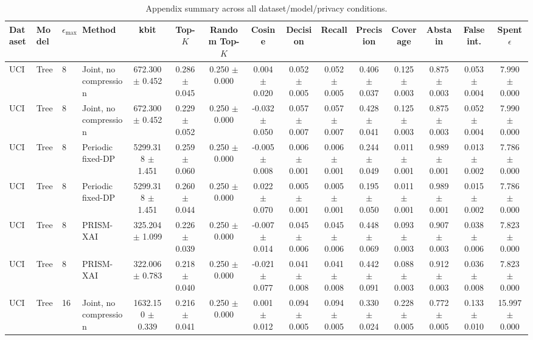 \begin{table}[t]
\caption{Appendix summary across all dataset/model/privacy conditions.}
\label{tab:appendix-conditions}
\centering
\scriptsize
\setlength{\tabcolsep}{2.5pt}
\begin{tabular}{llllccccccccccc}
\toprule
Dataset & Model & $\epsilon_{\max}$ & Method & kbit & Top-$K$ & Random Top-$K$ & Cosine & Decision & Recall & Precision & Coverage & Abstain & False int. & Spent $\epsilon$ \\
\midrule
UCI & Tree & 8 & Joint, no compression & 672.300 $\pm$ 0.452 & 0.286 $\pm$ 0.045 & 0.250 $\pm$ 0.000 & 0.004 $\pm$ 0.020 & 0.052 $\pm$ 0.005 & 0.052 $\pm$ 0.005 & 0.406 $\pm$ 0.037 & 0.125 $\pm$ 0.003 & 0.875 $\pm$ 0.003 & 0.053 $\pm$ 0.004 & 7.990 $\pm$ 0.000 \\
UCI & Tree & 8 & Joint, no compression & 672.300 $\pm$ 0.452 & 0.229 $\pm$ 0.052 & 0.250 $\pm$ 0.000 & -0.032 $\pm$ 0.050 & 0.057 $\pm$ 0.007 & 0.057 $\pm$ 0.007 & 0.428 $\pm$ 0.041 & 0.125 $\pm$ 0.003 & 0.875 $\pm$ 0.003 & 0.052 $\pm$ 0.004 & 7.990 $\pm$ 0.000 \\
UCI & Tree & 8 & Periodic fixed-DP & 5299.318 $\pm$ 1.451 & 0.259 $\pm$ 0.060 & 0.250 $\pm$ 0.000 & -0.005 $\pm$ 0.008 & 0.006 $\pm$ 0.001 & 0.006 $\pm$ 0.001 & 0.244 $\pm$ 0.049 & 0.011 $\pm$ 0.001 & 0.989 $\pm$ 0.001 & 0.013 $\pm$ 0.002 & 7.786 $\pm$ 0.000 \\
UCI & Tree & 8 & Periodic fixed-DP & 5299.318 $\pm$ 1.451 & 0.260 $\pm$ 0.044 & 0.250 $\pm$ 0.000 & 0.022 $\pm$ 0.070 & 0.005 $\pm$ 0.001 & 0.005 $\pm$ 0.001 & 0.195 $\pm$ 0.050 & 0.011 $\pm$ 0.001 & 0.989 $\pm$ 0.001 & 0.015 $\pm$ 0.002 & 7.786 $\pm$ 0.000 \\
UCI & Tree & 8 & PRISM-XAI & 325.204 $\pm$ 1.099 & 0.226 $\pm$ 0.039 & 0.250 $\pm$ 0.000 & -0.007 $\pm$ 0.014 & 0.045 $\pm$ 0.006 & 0.045 $\pm$ 0.006 & 0.448 $\pm$ 0.069 & 0.093 $\pm$ 0.003 & 0.907 $\pm$ 0.003 & 0.038 $\pm$ 0.006 & 7.823 $\pm$ 0.000 \\
UCI & Tree & 8 & PRISM-XAI & 322.006 $\pm$ 0.783 & 0.218 $\pm$ 0.040 & 0.250 $\pm$ 0.000 & -0.021 $\pm$ 0.077 & 0.041 $\pm$ 0.008 & 0.041 $\pm$ 0.008 & 0.442 $\pm$ 0.091 & 0.088 $\pm$ 0.003 & 0.912 $\pm$ 0.003 & 0.036 $\pm$ 0.008 & 7.823 $\pm$ 0.000 \\
UCI & Tree & 16 & Joint, no compression & 1632.150 $\pm$ 0.339 & 0.216 $\pm$ 0.041 & 0.250 $\pm$ 0.000 & 0.001 $\pm$ 0.012 & 0.094 $\pm$ 0.005 & 0.094 $\pm$ 0.005 & 0.330 $\pm$ 0.024 & 0.228 $\pm$ 0.005 & 0.772 $\pm$ 0.005 & 0.133 $\pm$ 0.010 & 15.997 $\pm$ 0.000 \\

\end{tabular}
\end{table}
